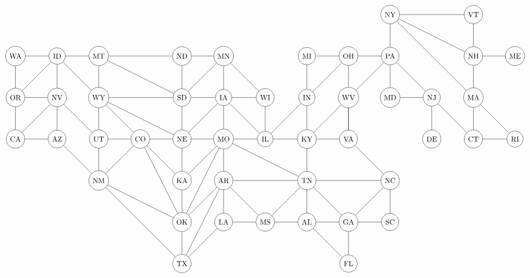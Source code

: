\documentclass[landscape]{proc}
\theoremstyle{definition}
\theoremstyle{remark}
\numberwithin{equation}{subsection}
\begin{document}
	
	
\[
\begin{tikzpicture}
\node[circle,draw] (WA) at (0,10){WA};
\node[circle,draw] (OR) at (0,8){OR};
\node[circle,draw] (CA) at (0,6){CA};
\node[circle,draw] (ID) at (2,10){ID};
\node[circle,draw] (NV) at (2,8){NV};
\node[circle,draw] (AZ) at (2,6){AZ};
\node[circle,draw] (MT) at (4,10){MT};
\node[circle,draw] (WY) at (4,8){WY};
\node[circle,draw] (UT) at (4,6){UT};
\node[circle,draw] (NM) at (4,4){NM};
\node[circle,draw] (CO) at (6,6){CO};
\node[circle,draw] (ND) at (8,10){ND};
\node[circle,draw] (SD) at (8,8){SD};
\node[circle,draw] (NE) at (8,6){NE};
\node[circle,draw] (KA) at (8,4){KA};
\node[circle,draw] (OK) at (8,2) {OK};
\node[circle,draw] (TX) at (8,0){TX};
\node[circle,draw] (MN) at (10,10){MN};
\node[circle,draw] (IA) at (10,8){IA};
\node[circle,draw] (MO) at (10,6){MO};
\node[circle,draw] (AR) at (10,4){AR};
\node[circle,draw] (LA) at (10,2){LA};
\node[circle,draw] (WI) at (12,8){WI};
\node[circle,draw] (IL) at (12,6){IL};
\node[circle,draw] (MS) at (12,2){MS};
\node[circle,draw] (MI) at (14,10){MI};
\node[circle,draw] (IN) at (14,8){IN};
\node[circle,draw] (KY) at (14,6){KY};
\node[circle,draw] (TN) at (14,4){TN};
\node[circle,draw] (AL) at (14,2){AL};
\node[circle,draw] (OH) at (16,10){OH};
\node[circle,draw] (WV) at (16,8){WV};
\node[circle,draw] (VA) at (16,6){VA};
\node[circle,draw] (GA) at (16,2){GA};
\node[circle,draw] (FL) at (16,0){FL};
\node[circle,draw] (NY) at (18,12){NY};
\node[circle,draw] (PA) at (18,10){PA};
\node[circle,draw] (MD) at (18,8){MD};
\node[circle,draw] (NC) at (18,4){NC};
\node[circle,draw] (SC) at (18,2){SC};
\node[circle,draw] (NJ) at (20,8){NJ};
\node[circle,draw] (DE) at (20,6){DE};
\node[circle,draw] (VT) at (22,12){VT};
\node[circle,draw] (NH) at (22,10){NH};
\node[circle,draw] (MA) at (22,8){MA};
\node[circle,draw] (CT) at (22,6){CT};
\node[circle,draw] (RI) at (24,6){RI};
\node[circle,draw] (ME) at (24,10){ME};

	
\foreach \from/\to in {CA/OR,OR/WA,WA/ID,ID/OR,ID/NV,OR/NV,NV/AZ,CA/AZ,CA/NV,ID/MT,MT/ND,MT/SD,ID/WY,MT/WY,WY/UT,WY/CO,WY/NE,WY/SD,NV/UT,NM/AZ,NM/UT,TX/OK,NM/CO,NM/TX,NM/OK,CO/NE,CO/KA,CO/OK,CO/UT,ND/SD,SD/NE,NE/KA,KA/OK,MN/ND,MN/SD,MN/IA,IA/SD,IA/NE,IA/MO,MO/NE,MO/KA,MO/OK,MO/AR,MO/TN,AR/OK,AR/TX,AR/LA,LA/TX,MN/WI,IA/WI,WI/IL,IL/IA,IL/MO,IL/KY,MS/AR,MS/LA,MI/IN,MI/OH,IN/IL,IN/KY,KY/TN,TN/MS,TN/AR,TN/AL,AL/MS,AL/FL,OH/IN,OH/WV,WV/VA,WV/KY,WV/VA,VA/KY,VA/NC,NC/GA,NC/TN,NC/SC,SC/GA,GA/AL,GA/TN,GA/FL,PA/OH,PA/WV,PA/NJ,PA/MD,MD/NJ,NJ/DE,NJ/CT,CT/RI,NY/PA,NY/VT,NY/NH,NY/MA,VT/NH,NH/MA,MA/CT,MA/RI,NH/ME}
\draw (\from) -- (\to);
\end{tikzpicture}
\]
	
	
\end{document}
